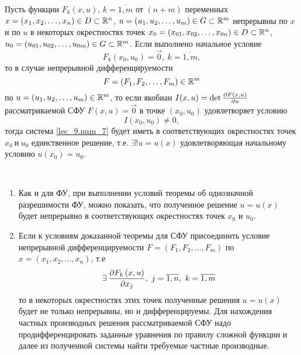 \documentclass[../main.tex]{subfiles}
\begin{document}
\begin{thm}
Пусть функции $F_k\left(x, u\right)$, $k = \overline{1, m}$
от $(n+ m)$ переменных 
$x = \left(x_1, x_2, \dots, x_n\right) \in D \subset \mathbb{R}^n$,
$u = \left(u_1, u_2, \dots, u_m\right) \in G \subset \mathbb{R}^m$
непрерывны по $x$ и по $u$ в некоторых окрестностях точек
$x_0 = \left(x_{01}, x_{02}, \dots, x_{0n}\right) \in D 
\subset \mathbb{R}^n$,
$u_0 = \left(u_{01}, u_{02}, \dots, u_{0m}\right) \in G
\subset \mathbb{R}^m$. Если выполнено начальное условие
\begin{equation}
    \label{lec_9.num_12}
    F_k(x_0, u_0) = \vec{0},\ k = \overline{1, m},
\end{equation}
то в случае непрерывной дифференцируемости
\begin{equation}
    \label{lec_9.num_13}
    F = \left(F_1, F_2, \dots, F_m\right) \in \mathbb{R}^m
\end{equation}
по $u = \left(u_1, u_2, \dots, u_m\right) \in \mathbb{R}^m$,
то если якобиан
$I(x, u) = \det\frac{\partial F\left(x, u\right)}{\partial u}$
рассматриваемой СФУ $F\left(x, u\right) = \vec{0}$
в точке $\left(x_0, u_0\right)$ удовлетворяет условию
\begin{equation}
    \label{lec_9.num_14}
    I(x_0, u_0) \neq 0,
\end{equation}
тогда система \eqref{lec_9.num_7} будет иметь в 
соответствующих окрестностях точек $x_0\ \text{и}\ u_0$
единственное решение, т.е. $\exists!u = u(x)$ удовлетворяющая начальному
 условию $u(x_0) = u_0$.
\end{thm}
\begin{rems}

~

    \begin{enumerate}
        \item Как и для ФУ, при выполнении условий 
        теоремы об однозначной разрешимости ФУ, можно показать,
        что полученное решение $u = u\left(x\right)$
        будет непрерывно в соответствующих окрестностях
        точек $x_0$ и $u_0$.
        \item Если к условиям доказанной теоремы для
        СФУ присоединить условие непрерывной 
        дифференцируемости
        $F = \left(F_1, F_2, \dots, F_m\right)$ по
        $x = \left(x_1, x_2, \dots, x_n\right)$, т.е 
        \[\exists\:
        \pderiv{F_k\left(x, u\right)}{x_j},\ 
        j = \overline{1, n},\ k = \overline{1, m}\] то в некоторых окрестностях
        этих точек полученные решения 
        $u = u\left(x\right)$ будет не только 
        непрерывны, но и дифференцируемы.
        Для нахождения частных производных решения
        рассматриваемой СФУ надо продифференцировать
        заданные уравнения по правилу сложной функции и
        далее из полученной системы найти требуемые частные производные. 
    \end{enumerate}
\end{rems}
\end{document}
